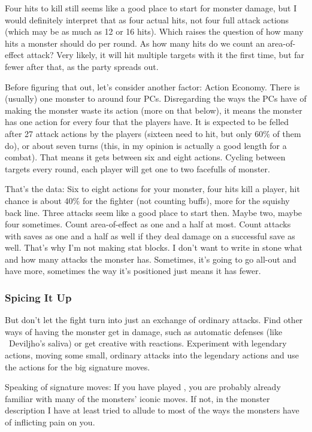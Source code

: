 Four hits to kill still seems like a good place to start for monster damage, but I would definitely interpret that as four actual hits, not four full attack actions (which may be as much as 12 or 16 hits). Which raises the question of how many hits a monster should do per round. As how many hits do we count an area-of-effect attack? Very likely, it will hit multiple targets with it the first time, but far fewer after that, as the party spreads out.

Before figuring that out, let's consider another factor: Action Economy. There is (usually) one monster to around four PCs. Disregarding the ways the PCs have of making the monster waste its action (more on that below), it means the monster has one action for every four that the players have. It is expected to be felled after 27 attack actions by the players (sixteen need to hit, but only 60\% of them do), or about seven turns (this, in my opinion is actually a good length for a combat). That means it gets between six and eight actions. Cycling between targets every round, each player will get one to two facefulls of monster.

That's the data: Six to eight actions for your monster, four hits kill a player, hit chance is about 40\% for the fighter (not counting buffs), more for the squishy back line. Three attacks seem like a good place to start then. Maybe two, maybe four sometimes. Count area-of-effect as one and a half at most. Count attacks with saves as one and a half as well if they deal damage on a successful save as well. That's why I'm not making stat blocks. I don't want to write in stone what and how many attacks the monster has. Sometimes, it's going to go all-out and have more, sometimes the way it's positioned just means it has fewer.

\subsubsection{Spicing It Up}
But don't let the fight turn into just an exchange of ordinary attacks. Find other ways of having the monster get in damage, such as automatic defenses (like ~Deviljho's saliva) or get creative with reactions. Experiment with legendary actions, moving some small, ordinary attacks into the legendary actions and use the actions for the big signature moves.

Speaking of signature moves: If you have played \MH{}, you are probably already familiar with many of the monsters' iconic moves. If not, in the monster description I have at least tried to allude to most of the ways the monsters have of inflicting pain on you.

